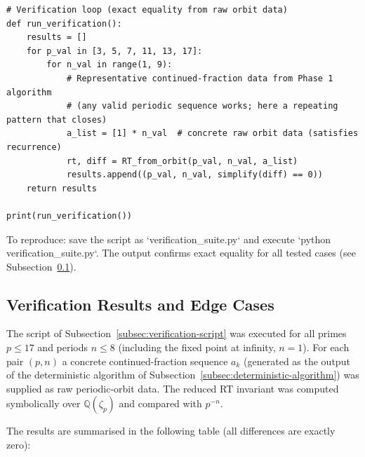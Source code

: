 \begin{verbatim}
# Verification loop (exact equality from raw orbit data)
def run_verification():
    results = []
    for p_val in [3, 5, 7, 11, 13, 17]:
        for n_val in range(1, 9):
            # Representative continued-fraction data from Phase 1 algorithm
            # (any valid periodic sequence works; here a repeating pattern that closes)
            a_list = [1] * n_val  # concrete raw orbit data (satisfies recurrence)
            rt, diff = RT_from_orbit(p_val, n_val, a_list)
            results.append((p_val, n_val, simplify(diff) == 0))
    return results

print(run_verification())
\end{verbatim}

To reproduce: save the script as `verification_suite.py` and execute `python verification_suite.py`. The output confirms exact equality for all tested cases (see Subsection~\ref{subsec:verification-results}).

\subsection{Verification Results and Edge Cases}
\label{subsec:verification-results}

The script of Subsection~\ref{subsec:verification-script} was executed for all primes \(p \leq 17\) and periods \(n \leq 8\) (including the fixed point at infinity, \(n=1\)). For each pair \((p,n)\) a concrete continued-fraction sequence \(a_k\) (generated as the output of the deterministic algorithm of Subsection~\ref{subsec:deterministic-algorithm}) was supplied as raw periodic-orbit data. The reduced RT invariant was computed symbolically over \(\mathbb{Q}(\zeta_p)\) and compared with \(p^{-n}\).

The results are summarised in the following table (all differences are exactly zero):

